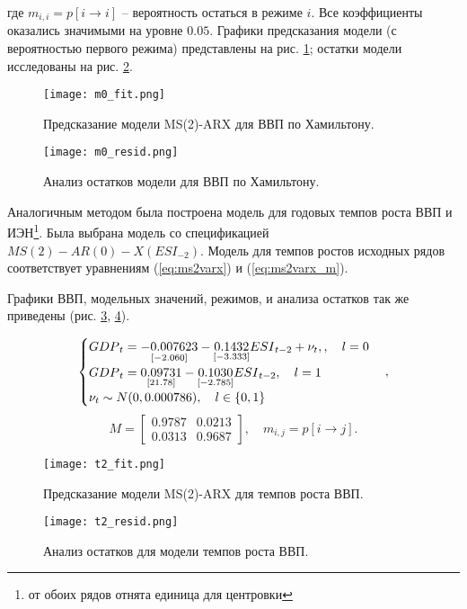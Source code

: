 \documentclass[a4paper,14pt]{extreport}
\begin{document}
	где $m_{i,i} = p[i \rightarrow i]$ -- вероятность остаться в режиме $i$. Все коэффициенты оказались значимыми на уровне $0.05$. Графики предсказания модели (с вероятностью первого режима) представлены на рис. \ref{fig:hp-fitcompare}; остатки модели исследованы на рис. \ref{fig:hp-residcomp}.
	
	{
		\begin{figure}
			\texttt{[image: m0\_fit.png]}
			\caption{Предсказание модели MS(2)-ARX для ВВП по Хамильтону.}
			\label{fig:hp-fitcompare}
		\end{figure}
		\begin{figure}
			\texttt{[image: m0\_resid.png]}
			\caption{Анализ остатков модели для ВВП по Хамильтону.}
			\label{fig:hp-residcomp}
		\end{figure}
	}
	
	
	Аналогичным методом была построена модель для годовых темпов роста ВВП и ИЭН\footnote{от обоих рядов отнята единица для центровки}. Была выбрана модель со спецификацией $MS(2)-AR(0)-X({ESI}_{-2})$. Модель для темпов ростов исходных рядов соответствует уравнениям (\ref{eq:ms2varx}) и (\ref{eq:ms2varx_m}).
	
	Графики ВВП, модельных значений, режимов, и анализа остатков так же приведены (рис. \ref{fig:hp-fitcompare2}, \ref{fig:hp-residcompare2}).
	
	
	{
		\begin{equation}
		\begin{cases}
		{GDP}_{t} = 
		\underset{[-2.060]}{-0.007623} 
		- \underset{[-3.333]}{0.1432} {ESI}_{t-2}
		+ \nu_{t} , \space 
		, \quad l=0 \\
		{GDP}_{t} = 
		\underset{[21.78]}{0.09731}
		- \underset{[-2.785]}{0.1030} {ESI}_{t-2}
		, \quad l=1 \\
		\nu_{t} \sim N(0, 0.000786) , \quad l \in \{0, 1\}
		\end{cases},
		\label{eq:ms2varx}
		\end{equation}
		\begin{equation}
		M = 
		\begin{bmatrix}
		0.9787 & 0.0213 \\
		0.0313 & 0.9687
		\end{bmatrix}
		, \quad m_{i,j} = p[i \rightarrow j]
		.
		\label{eq:ms2varx_m}
		\end{equation}		
	}
	
	{
		\begin{figure}
			\texttt{[image: t2\_fit.png]}
			\caption{Предсказание модели MS(2)-ARX для темпов роста ВВП.}
			\label{fig:hp-fitcompare2}
		\end{figure}
		\begin{figure}
			\texttt{[image: t2\_resid.png]}
			\caption{Анализ остатков для модели темпов роста ВВП.}
			\label{fig:hp-residcompare2}
		\end{figure}
	}
	
\end{document}
